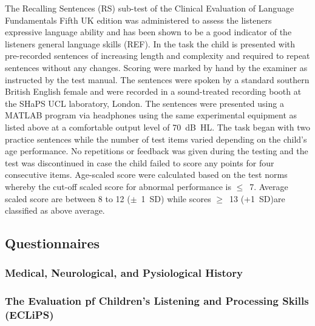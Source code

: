 \documentclass[a4paper, twoside]{templates/ociamthesis}
\begin{document}
The Recalling Sentences (RS) sub-test of the Clinical Evaluation of Language Fundamentals Fifth UK edition \autocite[CELF-5-UK][]{HWiig2017} was administered to assess the listeners expressive language ability and has been shown to be a good indicator of the listeners general language skills (REF). In the task the child is presented with pre-recorded sentences of increasing length and complexity and required to repeat sentences without any changes. Scoring were marked by hand by the examiner as instructed by the test manual. The sentences were spoken by a standard southern British English female and were recorded in a sound-treated recording booth at the SHaPS UCL laboratory, London. The sentences were presented using a MATLAB program via headphones using the same experimental equipment as listed above at a comfortable output level of 70~dB~HL. The task began with two practice sentences while the number of test items varied depending on the child's age performance. No repetitions or feedback was given during the testing and the test was discontinued in case the child failed to score any points for four consecutive items. Age-scaled score were calculated based on the test norms whereby the cut-off scaled score for abnormal performance is \(\leq\)~7. Average scaled score are between 8 to 12 (\(\pm\)~1~SD) while scores \(\geq\)~13 (+1~SD)are classified as above average.

\hypertarget{questionnaires}{%
\subsection{Questionnaires}\label{questionnaires}}

\hypertarget{medical-neurological-and-pysiological-history}{%
\subsubsection*{Medical, Neurological, and Pysiological History}\label{medical-neurological-and-pysiological-history}}

\hypertarget{the-evaluation-pf-childrens-listening-and-processing-skills-eclips}{%
\subsubsection*{The Evaluation pf Children's Listening and Processing Skills (ECLiPS)}\label{the-evaluation-pf-childrens-listening-and-processing-skills-eclips}}
\end{document}
